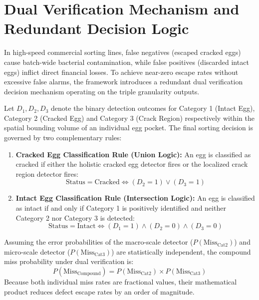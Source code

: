 \documentclass[12pt,a4paper]{report}
\begin{document}
\section{Dual Verification Mechanism and Redundant Decision Logic}

In high-speed commercial sorting lines, false negatives (escaped cracked eggs) cause batch-wide bacterial contamination, while false positives (discarded intact eggs) inflict direct financial losses. To achieve near-zero escape rates without excessive false alarms, the framework introduces a redundant dual verification decision mechanism operating on the triple granularity outputs.

Let $D_1, D_2, D_3$ denote the binary detection outcomes for Category 1 (Intact Egg), Category 2 (Cracked Egg) and Category 3 (Crack Region) respectively within the spatial bounding volume of an individual egg pocket. The final sorting decision is governed by two complementary rules:
\begin{enumerate}[label=\arabic*.]
    \item \textbf{Cracked Egg Classification Rule (Union Logic):} An egg is classified as cracked if either the holistic cracked egg detector fires or the localized crack region detector fires:
    \begin{equation}
    \text{Status} = \text{Cracked} \iff (D_2 = 1) \lor (D_3 = 1)
    \end{equation}
    \item \textbf{Intact Egg Classification Rule (Intersection Logic):} An egg is classified as intact if and only if Category 1 is positively identified and neither Category 2 nor Category 3 is detected:
    \begin{equation}
    \text{Status} = \text{Intact} \iff (D_1 = 1) \land (D_2 = 0) \land (D_3 = 0)
    \end{equation}
\end{enumerate}

Assuming the error probabilities of the macro-scale detector ($P(\text{Miss}_{\text{Cat2}})$) and micro-scale detector ($P(\text{Miss}_{\text{Cat3}})$) are statistically independent, the compound miss probability under dual verification is:
\begin{equation}
P(\text{Miss}_{\text{Compound}}) = P(\text{Miss}_{\text{Cat2}}) \times P(\text{Miss}_{\text{Cat3}})
\end{equation}
Because both individual miss rates are fractional values, their mathematical product reduces defect escape rates by an order of magnitude.
\end{document}
